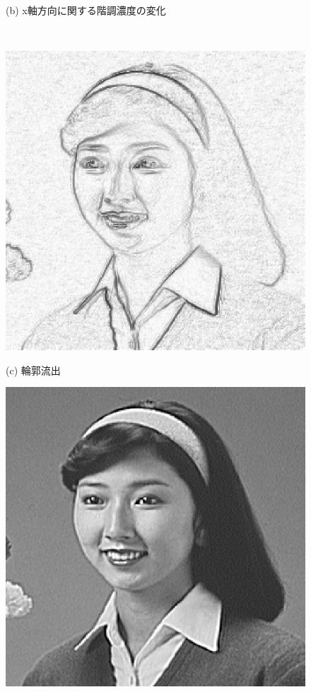 \begin{figure}[t]
\begin{center}
\begin{minipage}{.4\textwidth}
\begin{center}
(b) x軸方向に関する階調濃度の変化
\end{center}
\end{minipage}\\[.5\baselineskip]
\begin{minipage}{.4\textwidth}
\begin{center}
\includegraphics[width=.95\textwidth]{fig/hair1_rinkaku.eps}

(c) 輪郭流出
\end{center}
\end{minipage}
\begin{minipage}{.4\textwidth}
\begin{center}
\includegraphics[width=.95\textwidth]{fig/hair1_sharp.eps}


\end{center}
\end{minipage}
\end{center}
\end{figure}
